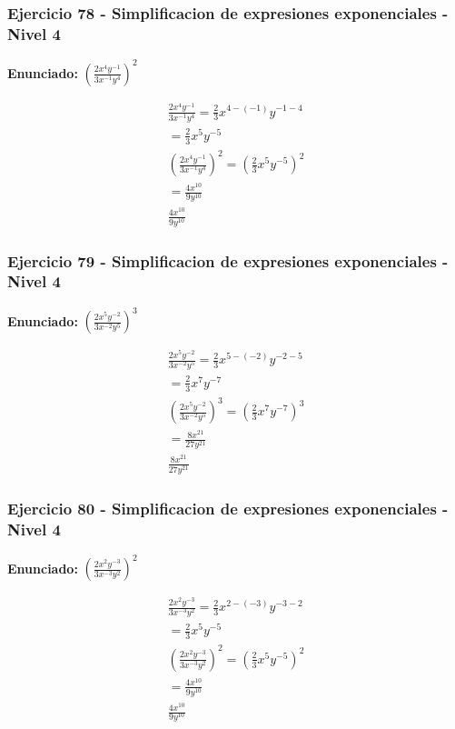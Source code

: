\documentclass[12pt,a4paper]{article}
\begin{document}
\subsubsection*{Ejercicio 78 - Simplificacion de expresiones exponenciales - Nivel 4}
\textbf{Enunciado:} \(\left(\frac{2x^{4}y^{-1}}{3x^{-1}y^{4}}\right)^{2}\)

\[
\begin{aligned}
\frac{2x^{4}y^{-1}}{3x^{-1}y^{4}}=\frac{2}{3}x^{4-(-1)}y^{-1-4}\\
=\frac{2}{3}x^{5}y^{-5}\\
\left(\frac{2x^{4}y^{-1}}{3x^{-1}y^{4}}\right)^{2}=\left(\frac{2}{3}x^{5}y^{-5}\right)^{2}\\
=\frac{4x^{10}}{9y^{10}}\\
\boxed{\frac{4x^{10}}{9y^{10}}}
\end{aligned}
\]


\subsubsection*{Ejercicio 79 - Simplificacion de expresiones exponenciales - Nivel 4}
\textbf{Enunciado:} \(\left(\frac{2x^{5}y^{-2}}{3x^{-2}y^{5}}\right)^{3}\)

\[
\begin{aligned}
\frac{2x^{5}y^{-2}}{3x^{-2}y^{5}}=\frac{2}{3}x^{5-(-2)}y^{-2-5}\\
=\frac{2}{3}x^{7}y^{-7}\\
\left(\frac{2x^{5}y^{-2}}{3x^{-2}y^{5}}\right)^{3}=\left(\frac{2}{3}x^{7}y^{-7}\right)^{3}\\
=\frac{8x^{21}}{27y^{21}}\\
\boxed{\frac{8x^{21}}{27y^{21}}}
\end{aligned}
\]


\subsubsection*{Ejercicio 80 - Simplificacion de expresiones exponenciales - Nivel 4}
\textbf{Enunciado:} \(\left(\frac{2x^{2}y^{-3}}{3x^{-3}y^{2}}\right)^{2}\)

\[
\begin{aligned}
\frac{2x^{2}y^{-3}}{3x^{-3}y^{2}}=\frac{2}{3}x^{2-(-3)}y^{-3-2}\\
=\frac{2}{3}x^{5}y^{-5}\\
\left(\frac{2x^{2}y^{-3}}{3x^{-3}y^{2}}\right)^{2}=\left(\frac{2}{3}x^{5}y^{-5}\right)^{2}\\
=\frac{4x^{10}}{9y^{10}}\\
\boxed{\frac{4x^{10}}{9y^{10}}}
\end{aligned}
\]
\end{document}
